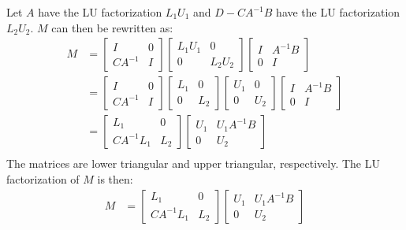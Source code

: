 \documentclass{article}
\begin{document}
Let $A$ have the LU factorization $L_1U_1$ and $D - CA^{-1}B$ have the LU factorization $L_2U_2$. $M$ can then be rewritten as:
\begin{align*}
    M & = \begin{bmatrix}
        I & 0 \\ CA^{-1} & I
    \end{bmatrix}
    \begin{bmatrix}
        L_1U_1 & 0 \\ 0 & L_2U_2
    \end{bmatrix}
    \begin{bmatrix}
        I & A^{-1}B \\ 0 & I
    \end{bmatrix} \\
    & = \begin{bmatrix}
        I & 0 \\ CA^{-1} & I
    \end{bmatrix}
    \begin{bmatrix}
        L_1 & 0 \\ 0 & L_2
    \end{bmatrix}
    \begin{bmatrix}
        U_1 & 0 \\ 0 & U_2
    \end{bmatrix}
    \begin{bmatrix}
        I & A^{-1}B \\ 0 & I
    \end{bmatrix} \\
    & = \begin{bmatrix}
        L_1 & 0 \\ CA^{-1}L_1 & L_2
    \end{bmatrix}
    \begin{bmatrix}
        U_1 & U_1A^{-1}B \\ 0 & U_2
    \end{bmatrix} \\
\end{align*}
The matrices are lower triangular and upper triangular, respectively. The LU factorization of $M$ is then:
\begin{align*}
    M & = \begin{bmatrix}
        L_1 & 0 \\ CA^{-1}L_1 & L_2
    \end{bmatrix}
    \begin{bmatrix}
        U_1 & U_1A^{-1}B \\ 0 & U_2
    \end{bmatrix} \\
\end{align*}
\end{document}
